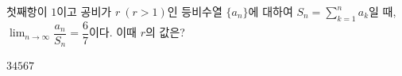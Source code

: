 첫째항이 $1$이고 공비가 $r\ (r>1)$인 등비수열 $\{a_n\}$에 대하여 $S_n=\displaystyle\sum_{k=1}^{n}a_k$일 때, $\displaystyle\lim_{n\to\infty}\dfrac{a_n}{S_n}=\dfrac{6}{7}$이다. 이때 $r$의 값은?
\begin{choices32}{$3$}{$4$}{$5$}{$6$}{$7$}\end{choices32}
